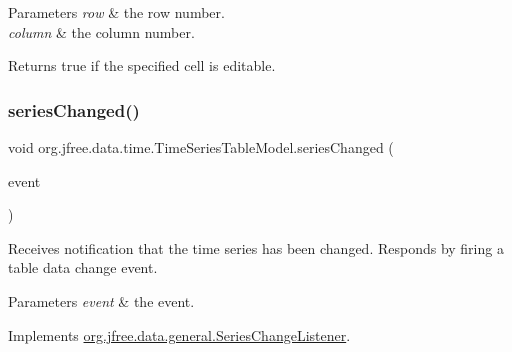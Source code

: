 \begin{DoxyParams}{Parameters}
{\em row} & the row number. \\
\hline
{\em column} & the column number.\\
\hline
\end{DoxyParams}
\begin{DoxyReturn}{Returns}
{\ttfamily true} if the specified cell is editable. 
\end{DoxyReturn}
\mbox{\label{classorg_1_1jfree_1_1data_1_1time_1_1_time_series_table_model_a677a0cd7e6da07877e06848a43056c26}} 
\subsubsection{\texorpdfstring{series\+Changed()}{seriesChanged()}}
{\footnotesize\ttfamily void org.\+jfree.\+data.\+time.\+Time\+Series\+Table\+Model.\+series\+Changed (\begin{DoxyParamCaption}\item[{\mbox{\hyperlink{classorg_1_1jfree_1_1data_1_1general_1_1_series_change_event}{Series\+Change\+Event}}}]{event }\end{DoxyParamCaption})}

Receives notification that the time series has been changed. Responds by firing a table data change event.


\begin{DoxyParams}{Parameters}
{\em event} & the event. \\
\hline
\end{DoxyParams}


Implements \mbox{\hyperlink{interfaceorg_1_1jfree_1_1data_1_1general_1_1_series_change_listener_a441fd65d1290b91e0184124be928ebf7}{org.\+jfree.\+data.\+general.\+Series\+Change\+Listener}}.

\mbox{\label{classorg_1_1jfree_1_1data_1_1time_1_1_time_series_table_model_ad5abdf4a9321a1b9ba716f786ad5131f}} 
